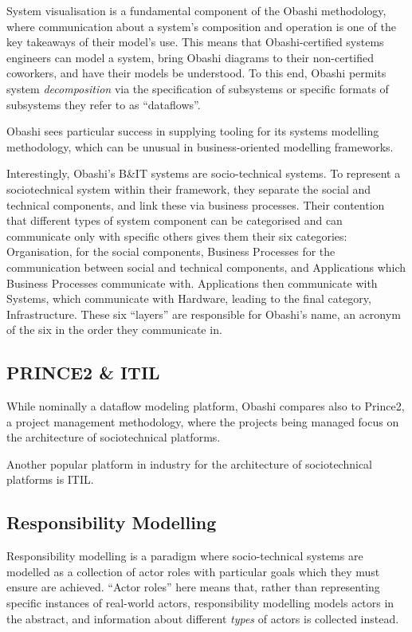 System visualisation is a fundamental component of the Obashi methodology, where
communication about a system's composition and operation is one of the key
takeaways of their model's use. This means that Obashi-certified systems
engineers can model a system, bring Obashi diagrams to their non-certified
coworkers, and have their models be understood. To this end, Obashi permits
system \emph{decomposition} via the specification of subsystems or specific
formats of subsystems they refer to as ``dataflows''.
\par

Obashi sees particular success in supplying tooling for its systems
modelling methodology, which can be unusual in business-oriented modelling
frameworks.
\par

Interestingly, Obashi's B\&IT systems are socio-technical systems. To represent
a sociotechnical system within their framework, they separate the social and
technical components, and link these via business processes. Their contention
that different types of system component can be categorised and can communicate
only with specific others gives them their six categories: Organisation, for the
social components, Business Processes for the communication between social and
technical components, and Applications which Business Processes communicate
with. Applications then communicate with Systems, which communicate with
Hardware, leading to the final category, Infrastructure. These six ``layers''
are responsible for Obashi's name, an acronym of the six in the order they
communicate in.
\par

\subsection{PRINCE2 \& ITIL}
While nominally a dataflow modeling platform, Obashi compares also to Prince2,
a project management methodology, where the projects being managed focus on the
architecture of sociotechnical platforms.


Another popular platform in industry for the architecture of sociotechnical
platforms is ITIL.


\subsection{Responsibility Modelling}
Responsibility modelling is a paradigm where socio-technical systems are
modelled as a collection of actor roles with particular goals which they must
ensure are achieved. ``Actor roles'' here means that, rather than representing
specific instances of real-world actors, responsibility modelling models actors
in the abstract, and information about different \emph{types} of actors is
collected instead.
\par

